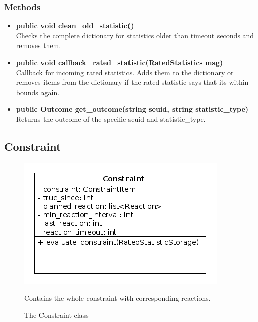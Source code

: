 \subsubsection{Methods}
\begin{itemize}
	\item \textbf{ public void clean\_old\_statistic() }\\
		Checks the complete dictionary for statistics older than timeout seconds and removes them.
	\item \textbf{ public void callback\_rated\_statistic(RatedStatistics msg) }\\
		Callback for incoming rated statistics. Adds them to the dictionary or removes items from the dictionary if the rated statistic says that its within bounds again. 
	\item \textbf{ public Outcome get\_outcome(string seuid, string statistic\_type) }\\
		Returns the outcome of the specific seuid and statistic\_type.
\end{itemize}

\newpage
\subsection{Constraint}
\begin{figure}[htbp]
	\begin{minipage}[t]{8cm}
		\vspace{0pt}
		\centering
		\includegraphics[scale=0.6]{./diagram_pictures/reactor/Constraint.png}
		\caption{The Constraint class}
	\end{minipage}
	\hfill
	\begin{minipage}[t]{8cm}
		\vspace{10pt}
			Contains the whole constraint with corresponding reactions.
	\end{minipage}
\end{figure}  


